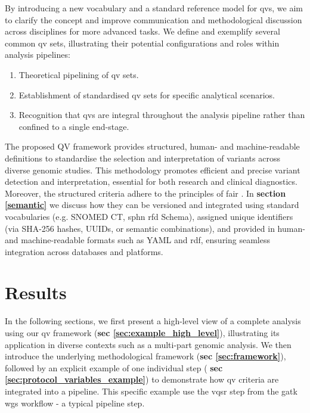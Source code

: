 By introducing a new vocabulary and a standard reference model for \ac{qv}s, we aim to clarify the concept and improve communication and methodological discussion across disciplines for more advanced tasks.
We define and exemplify several common \ac{qv} sets, illustrating their potential configurations and roles within analysis pipelines:
\begin{enumerate}
    \item Theoretical pipelining of \ac{qv} sets.
    \item Establishment of standardised \ac{qv} sets for specific analytical scenarios.
    \item Recognition that \ac{qv}s are integral throughout the analysis pipeline rather than confined to a single end-stage.
\end{enumerate}

The proposed QV framework provides structured, human- and machine-readable definitions to standardise the selection and interpretation of variants across diverse genomic studies. This methodology promotes efficient and precise variant detection and interpretation, essential for both research and clinical diagnostics. 
Moreover, the structured criteria adhere to the principles of \ac{fair} \cite{wilkinson2016fair}. 
In \textbf{section \ref{semantic}} we discuss how they can be versioned and integrated using standard vocabularies (e.g. SNOMED CT, \ac{sphn} \ac{rfd} Schema), assigned unique identifiers (via SHA-256 hashes, UUIDs, or semantic combinations), and provided in human- and machine-readable formats such as YAML and \ac{rdf}, ensuring seamless integration across databases and platforms.

\section{Results}

In the following sections, we first present a high-level view of a complete analysis using our \ac{qv} framework 
(\textbf{sec \ref{sec:example_high_level}}), illustrating its application in diverse contexts such as a multi-part genomic analysis. We then introduce the underlying methodological framework 
(\textbf{sec \ref{sec:framework}}), followed by an explicit example of one individual step (\textbf{ sec \ref{sec:protocol_variables_example}}) to demonstrate how \ac{qv} criteria are integrated into a pipeline. This specific example use the \ac{vqsr} step from the 
\ac{gatk} \ac{wgs} workflow \cite{auwera_genomics_2020} - a typical pipeline step.

